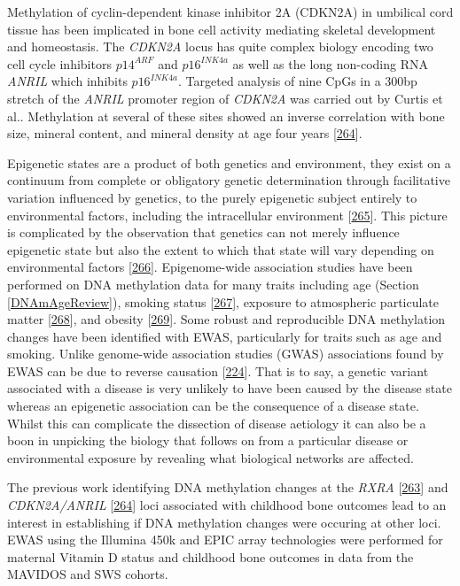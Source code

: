 \documentclass[
]{book}
\begin{document}
Methylation of cyclin-dependent kinase inhibitor 2A (CDKN2A) in umbilical cord tissue has been implicated in bone cell activity mediating skeletal development and homeostasis.
The \emph{CDKN2A} locus has quite complex biology encoding two cell cycle inhibitors \(p14^{ARF}\) and \(p16^{INK4a}\) as well as the long non-coding RNA \emph{ANRIL} which inhibits \(p16^{INK4a}\).
Targeted analysis of nine CpGs in a 300bp stretch of the \emph{ANRIL} promoter region of \emph{CDKN2A} was carried out by Curtis et al..
Methylation at several of these sites showed an inverse correlation with bone size, mineral content, and mineral density at age four years {[}\protect\hyperlink{ref-Curtis2017}{264}{]}.

Epigenetic states are a product of both genetics and environment, they exist on a continuum from complete or obligatory genetic determination through facilitative variation influenced by genetics, to the purely epigenetic subject entirely to environmental factors, including the intracellular environment {[}\protect\hyperlink{ref-Richards2006}{265}{]}.
This picture is complicated by the observation that genetics can not merely influence epigenetic state but also the extent to which that state will vary depending on environmental factors {[}\protect\hyperlink{ref-Holland2017}{266}{]}.
Epigenome-wide association studies have been performed on DNA methylation data for many traits including age (Section \ref{DNAmAgeReview}), smoking status {[}\protect\hyperlink{ref-Dogan2017}{267}{]}, exposure to atmospheric particulate matter {[}\protect\hyperlink{ref-Dai2016}{268}{]}, and obesity {[}\protect\hyperlink{ref-Wahl2016}{269}{]}.
Some robust and reproducible DNA methylation changes have been identified with EWAS, particularly for traits such as age and smoking.
Unlike genome-wide association studies (GWAS) associations found by EWAS can be due to reverse causation {[}\protect\hyperlink{ref-Birney2016}{224}{]}.
That is to say, a genetic variant associated with a disease is very unlikely to have been caused by the disease state whereas an epigenetic association can be the consequence of a disease state.
Whilst this can complicate the dissection of disease aetiology it can also be a boon in unpicking the biology that follows on from a particular disease or environmental exposure by revealing what biological networks are affected.

The previous work identifying DNA methylation changes at the \emph{RXRA} {[}\protect\hyperlink{ref-Harvey2014d}{263}{]} and \emph{CDKN2A/ANRIL} {[}\protect\hyperlink{ref-Curtis2017}{264}{]} loci associated with childhood bone outcomes lead to an interest in establishing if DNA methylation changes were occuring at other loci.
EWAS using the Illumina 450k and EPIC array technologies were performed for maternal Vitamin D status and childhood bone outcomes in data from the MAVIDOS and SWS cohorts.
\end{document}

